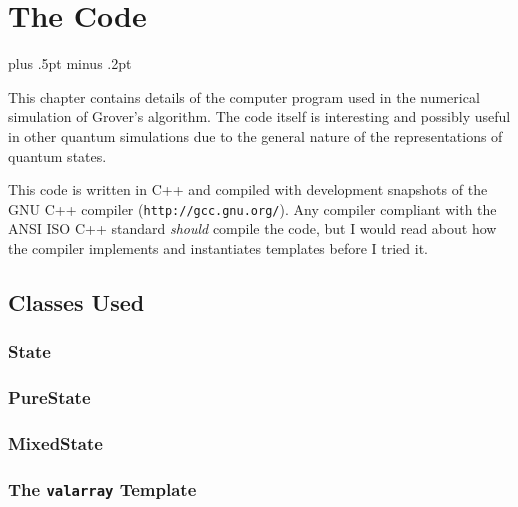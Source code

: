 

\chapter{The Code}
\label{chap:code}

\baselineskip=15.5pt plus .5pt minus .2pt

This chapter contains details of the computer program used
in the numerical simulation of Grover's algorithm.
The code itself is interesting and possibly useful in
other quantum simulations due to the general nature of the
representations of quantum states.

This code is written in C++ and compiled with development
snapshots of the GNU C++ compiler (\texttt{http://gcc.gnu.org/}).
Any compiler compliant with the ANSI ISO C++ standard \emph{should}
compile the code, but I would read about how the compiler implements
and instantiates templates before I tried it.


\section{Classes Used}

\subsection{State}
\subsection{PureState}
\subsection{MixedState}
\subsection{The \texttt{valarray} Template}


